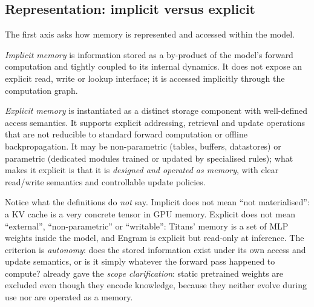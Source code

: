 \subsection{Representation: implicit versus explicit}\label{sec:c02-representation}

The first axis asks how memory is represented and accessed within the model.

\begin{definition}\label{def:c02-implicit}
\emph{Implicit memory} is information stored as a by-product of the model's forward computation
and tightly coupled to its internal dynamics. It does not expose an explicit read, write or
lookup interface; it is accessed implicitly through the computation graph.
\end{definition}

\begin{definition}\label{def:c02-explicit}
\emph{Explicit memory} is instantiated as a distinct storage component with well-defined access
semantics. It supports explicit addressing, retrieval and update operations that are not
reducible to standard forward computation or offline backpropagation. It may be non-parametric
(tables, buffers, datastores) or parametric (dedicated modules trained or updated by specialised
rules); what makes it explicit is that it is \emph{designed and operated as memory}, with clear
read/write semantics and controllable update policies.
\end{definition}

Notice what the definitions do \emph{not} say. Implicit does not mean ``not materialised'': a KV
cache is a very concrete tensor in GPU memory. Explicit does not mean ``external'',
``non-parametric'' or ``writable'': Titans' memory is a set of MLP weights inside the model, and
Engram is explicit but read-only at inference. The criterion is
\emph{autonomy}: does the stored information exist under its own access and update semantics, or
is it simply whatever the forward pass happened to compute?  already gave the
\emph{scope clarification}: static pretrained weights are excluded even though they encode
knowledge, because they neither evolve during use nor are operated as a memory.

